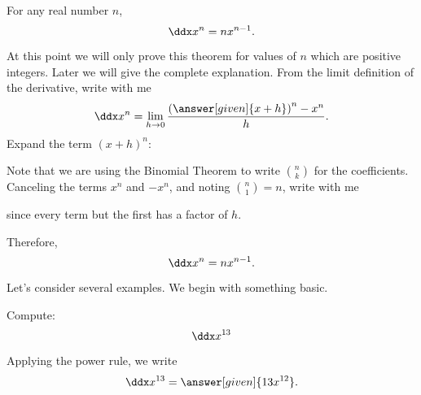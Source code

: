 \documentclass{ximera}
\begin{document}
\begin{theorem}\label{T:powerrule}
For any real number $n$, 
\[
\ddx x^n = n x^{n-1}.
\]

\begin{explanation}
At this point we will only prove this theorem for values of $n$ which
are positive integers. Later we will give the complete explanation.
From the limit definition of the derivative, write with me
\[
\ddx x^n = \lim_{ h\to0} \frac{\left(\answer[given]{x+ h}\right)^n-x^n}{h}.
\]
Expand the term $(x+h)^n$:
\begin{image}
\end{image}
Note that we are using the Binomial Theorem to write $\binom{n}{k}$
for the coefficients. Canceling the terms $x^n$ and $-x^n$, and noting
$\binom{n}{1}= n$, write with me
\begin{image}
\end{image}

since every term but the first has a factor of $h$.

Therefore,
\[
\ddx x^n = nx^{n-1}.
\]
\end{explanation}
\end{theorem}

Let's consider several examples. We begin with something basic.

\begin{example}
Compute:
\[
\ddx x^{13}
\]
\begin{explanation}
Applying the power rule, we write
\[
\ddx x^{13} = \answer[given]{13x^{12}}.
\]
\end{explanation}
\end{example}
\end{document}
